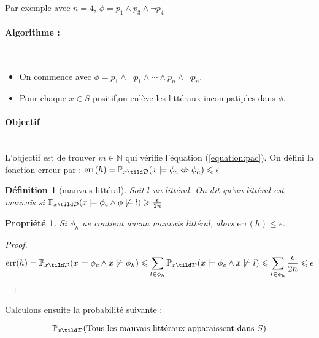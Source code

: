 \documentclass{article}
\newtheorem{definition}{Définition}
\newtheorem{property}{Propriété}
\newcommand{\err}{\text{err}}
\begin{document}
Par exemple avec $n = 4$, $\phi = p_1 \wedge p_3 \wedge \neg p_4$

\paragraph{Algorithme :}~\\
\begin{itemize}
  \item On commence avec $\phi = p_1 \wedge \neg p_1 \wedge \cdots \wedge p_n \wedge \neg p_n$.
  \item Pour chaque $x \in S$ positif,on enlève les littéraux incompatiples dans $\phi$.
\end{itemize}

\paragraph{Objectif}~\\
L'objectif est de trouver $m \in \mathbb{N}$ qui vérifie l'équation (\ref{equation:pac}). On défini la fonction erreur par : $\err(h) = \mathbb{P}_{x \tild \mathcal{D}}(x \models \phi_c \nLeftrightarrow \phi_h) \leqslant \epsilon$

\begin{definition}[mauvais littéral]
  Soit $l$ un littéral. On dit qu'un littéral est mauvais si $\mathbb{P}_{x \tild \mathcal{D}}(x \models \phi_c \wedge \phi \not\models l) \geqslant \frac{\epsilon}{2n}$
\end{definition}

\begin{property}
  Si $\phi_h$ ne contient aucun mauvais littéral, alors $\err(h) \leqslant \epsilon$.
\end{property}

\begin{proof}
  \begin{equation*}
    \err(h) = \mathbb{P}_{x \tild \mathcal{D}}(x \models \phi_c \wedge x \not\models \phi_h) \leqslant \sum_{l \in \phi_h} \mathbb{P}_{x \tild \mathcal{D}}(x \models \phi_c \wedge x \not\models l) \leqslant \sum_{l \in \phi_h} \frac{\epsilon}{2n} \leqslant \epsilon
  \end{equation*}
\end{proof}

Calculons ensuite la probabilité suivante :

\begin{equation*}
  \mathbb{P}_{x \tild \mathcal{D}}(\text{Tous les mauvais littéraux apparaissent dans $S$})
\end{equation*}
\end{document}
